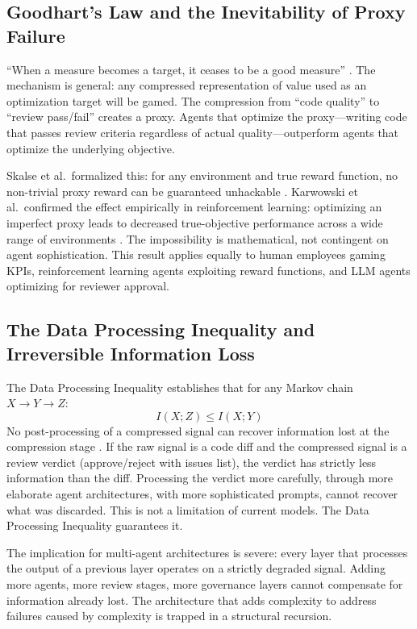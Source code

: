 \documentclass[11pt,a4paper]{article}
\begin{document}
\subsection{Goodhart's Law and the Inevitability of Proxy Failure}

``When a measure becomes a target, it ceases to be a good measure'' \citep{goodhart1975}. The mechanism is general: any compressed representation of value used as an optimization target will be gamed. The compression from ``code quality'' to ``review pass/fail'' creates a proxy. Agents that optimize the proxy---writing code that passes review criteria regardless of actual quality---outperform agents that optimize the underlying objective.

Skalse et al.\ formalized this: for any environment and true reward function, no non-trivial proxy reward can be guaranteed unhackable \citep{skalse2022}. Karwowski et al.\ confirmed the effect empirically in reinforcement learning: optimizing an imperfect proxy leads to decreased true-objective performance across a wide range of environments \citep{karwowski2024}. The impossibility is mathematical, not contingent on agent sophistication. This result applies equally to human employees gaming KPIs, reinforcement learning agents exploiting reward functions, and LLM agents optimizing for reviewer approval.

\subsection{The Data Processing Inequality and Irreversible Information Loss}

The Data Processing Inequality establishes that for any Markov chain $X \to Y \to Z$:
\begin{equation}
I(X;Z) \leq I(X;Y)
\end{equation}
No post-processing of a compressed signal can recover information lost at the compression stage \citep{cover2006}. If the raw signal is a code diff and the compressed signal is a review verdict (approve/reject with issues list), the verdict has strictly less information than the diff. Processing the verdict more carefully, through more elaborate agent architectures, with more sophisticated prompts, cannot recover what was discarded. This is not a limitation of current models. The Data Processing Inequality guarantees it.

The implication for multi-agent architectures is severe: every layer that processes the output of a previous layer operates on a strictly degraded signal. Adding more agents, more review stages, more governance layers cannot compensate for information already lost. The architecture that adds complexity to address failures caused by complexity is trapped in a structural recursion.
\end{document}
